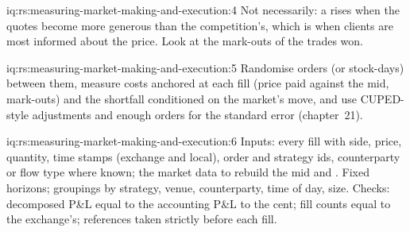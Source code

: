 \begin{solution}{iq:rs:measuring-market-making-and-execution:4}
Not necessarily: a  rises when the quotes become more generous than the competition's, which is when clients are most informed about the price. Look at
the mark-outs of the trades won.
\end{solution}

\begin{solution}{iq:rs:measuring-market-making-and-execution:5}
Randomise orders (or stock-days) between them, measure costs anchored at each fill (price paid against the mid, mark-outs) and the shortfall conditioned on the
market's move, and use CUPED-style adjustments and enough orders for the standard error (chapter~21).
\end{solution}

\begin{solution}{iq:rs:measuring-market-making-and-execution:6}
Inputs: every fill with side, price, quantity, time stamps (exchange and local), order and strategy ids, counterparty or flow type where known; the market data to
rebuild the mid and . Fixed horizons; groupings by strategy, venue, counterparty, time of day, size. Checks: decomposed P\&L equal to the accounting
P\&L to the cent; fill counts equal to the exchange's; references taken strictly before each fill.
\end{solution}
